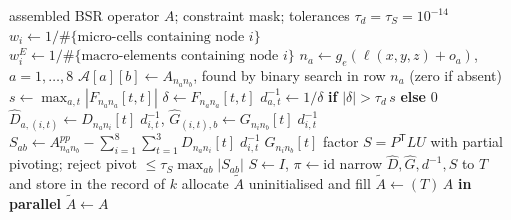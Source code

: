 \documentclass[11pt,a4paper]{article}
\newcommand{\code}[1]{\texttt{\small #1}}
\begin{document}
\begin{algorithm}[H]
\caption{Vanka set-up, \code{vanka\_setup}}\label{alg:setup}
\begin{algorithmic}[1]
\Require assembled BSR operator $A$; constraint mask; tolerances $\tau_d = \tau_S = 10^{-14}$
\State $w_i \gets 1/\#\{\text{micro-cells containing node } i\}$
\State $w^{E}_i \gets 1/\#\{\text{macro-elements containing node } i\}$
    \State $n_a \gets g_e(\ell(x,y,z) + o_a)$, \quad $a = 1,\dots,8$
     
      \State $\mathcal{A}[a][b] \gets A_{n_a n_b}$, found by binary search in row $n_a$
        (zero if absent)
    \EndFor
    \State $s \gets \max_{a,t} |F_{n_a n_a}[t,t]|$ 
      \State $\delta \gets F_{n_a n_a}[t,t]$
      \State $d^{-1}_{a,t} \gets 1/\delta$ \textbf{if} $|\delta| > \tau_d\, s$ \textbf{else} $0$
    \EndFor
    \State $\hat D_{a,(i,t)} \gets D_{n_a n_i}[t]\; d^{-1}_{i,t}$, \quad
           $\hat G_{(i,t),b} \gets G_{n_i n_b}[t]\; d^{-1}_{i,t}$
    \State $S_{ab} \gets A^{pp}_{n_a n_b}
           - \sum_{i=1}^{8}\sum_{t=1}^{3} D_{n_a n_i}[t]\; d^{-1}_{i,t}\; G_{n_i n_b}[t]$
    \State factor $S = P^{\mathsf T} L U$ with partial pivoting; reject pivot
           $\le \tau_S \max_{ab}|S_{ab}|$
      \State $S \gets I$, \; $\pi \gets \mathrm{id}$ 
    \EndIf
    \State narrow $\hat D, \hat G, d^{-1}, S$ to $T$ and store in the record of $k$
  \EndFor
\EndFor
{}
  \State allocate $\tilde A$ uninitialised and fill $\tilde A \gets (T)\,A$ \textbf{in parallel}
\Else
  \State $\tilde A \gets A$ 
\EndIf
\end{algorithmic}
\end{algorithm}
\end{document}
